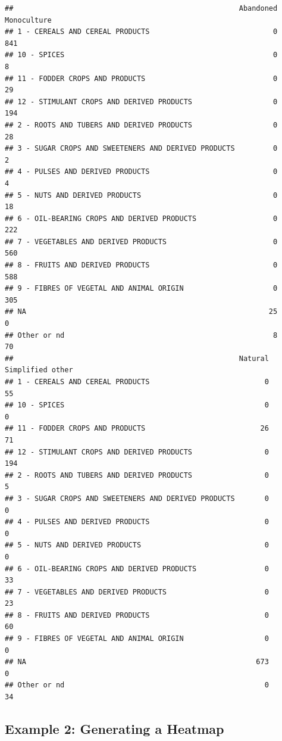 \documentclass[
]{book}
\begin{document}
\begin{verbatim}
##                                                     Abandoned Monoculture
## 1 - CEREALS AND CEREAL PRODUCTS                             0         841
## 10 - SPICES                                                 0           8
## 11 - FODDER CROPS AND PRODUCTS                              0          29
## 12 - STIMULANT CROPS AND DERIVED PRODUCTS                   0         194
## 2 - ROOTS AND TUBERS AND DERIVED PRODUCTS                   0          28
## 3 - SUGAR CROPS AND SWEETENERS AND DERIVED PRODUCTS         0           2
## 4 - PULSES AND DERIVED PRODUCTS                             0           4
## 5 - NUTS AND DERIVED PRODUCTS                               0          18
## 6 - OIL-BEARING CROPS AND DERIVED PRODUCTS                  0         222
## 7 - VEGETABLES AND DERIVED PRODUCTS                         0         560
## 8 - FRUITS AND DERIVED PRODUCTS                             0         588
## 9 - FIBRES OF VEGETAL AND ANIMAL ORIGIN                     0         305
## NA                                                         25           0
## Other or nd                                                 8          70
##                                                     Natural Simplified other
## 1 - CEREALS AND CEREAL PRODUCTS                           0               55
## 10 - SPICES                                               0                0
## 11 - FODDER CROPS AND PRODUCTS                           26               71
## 12 - STIMULANT CROPS AND DERIVED PRODUCTS                 0              194
## 2 - ROOTS AND TUBERS AND DERIVED PRODUCTS                 0                5
## 3 - SUGAR CROPS AND SWEETENERS AND DERIVED PRODUCTS       0                0
## 4 - PULSES AND DERIVED PRODUCTS                           0                0
## 5 - NUTS AND DERIVED PRODUCTS                             0                0
## 6 - OIL-BEARING CROPS AND DERIVED PRODUCTS                0               33
## 7 - VEGETABLES AND DERIVED PRODUCTS                       0               23
## 8 - FRUITS AND DERIVED PRODUCTS                           0               60
## 9 - FIBRES OF VEGETAL AND ANIMAL ORIGIN                   0                0
## NA                                                      673                0
## Other or nd                                               0               34
\end{verbatim}

\subsection{Example 2: Generating a Heatmap}\label{example-2-generating-a-heatmap}
\end{document}
